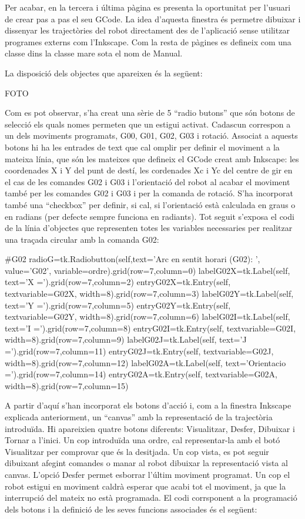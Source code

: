 Per acabar, en la tercera i última pàgina es presenta la oportunitat per l’usuari de crear pas a pas el seu GCode. La idea d’aquesta finestra és permetre dibuixar i dissenyar les trajectòries del robot directament des de l’aplicació sense utilitzar programes externs com l’Inkscape. Com la resta de pàgines es defineix com una classe dins la classe mare sota el nom de Manual. 

La disposició dels objectes que apareixen és la següent:

FOTO

Com es pot observar, s’ha creat una sèrie de 5  “radio butons” que són botons de selecció els quals nomes permeten que un estigui activat. Cadascun correspon a un dels moviments programats, G00, G01, G02, G03 i rotació. Associat a aquests botons hi ha les entrades de text que cal omplir per definir el moviment a la mateixa línia, que són les mateixes que defineix el GCode creat amb Inkscape: les coordenades X i Y del punt de destí, les cordenades Xc i Yc del centre de gir en el cas de les comandes G02 i G03 i l’orientació del robot al acabar el moviment també per les comandes G02 i G03 i per la comanda de rotació. S’ha incorporat també una “checkbox” per definir, si cal, si l’orientació està calculada en graus o en radians (per defecte sempre funciona en radiants). Tot seguit s'exposa el codi de la línia d'objectes que representen totes les variables necessaries per realitzar una traçada circular amb la comanda G02:

\begin{python}
		#G02
		radioG=tk.Radiobutton(self,text='Arc en sentit horari (G02): ', value='G02', variable=ordre).grid(row=7,column=0)
		labelG02X=tk.Label(self, text='X =').grid(row=7,column=2)
		entryG02X=tk.Entry(self, textvariable=G02X, width=8).grid(row=7,column=3)
		labelG02Y=tk.Label(self, text='Y =').grid(row=7,column=5)
		entryG02Y=tk.Entry(self, textvariable=G02Y, width=8).grid(row=7,column=6)
		labelG02I=tk.Label(self, text='I =').grid(row=7,column=8)
		entryG02I=tk.Entry(self, textvariable=G02I, width=8).grid(row=7,column=9)
		labelG02J=tk.Label(self, text='J =').grid(row=7,column=11)
		entryG02J=tk.Entry(self, textvariable=G02J, width=8).grid(row=7,column=12)
		labelG02A=tk.Label(self, text='Orientacio =').grid(row=7,column=14)
		entryG02A=tk.Entry(self, textvariable=G02A, width=8).grid(row=7,column=15)
\end{python}

A partir d’aquí s’han incorporat els botons d’acció i, com a la finestra Inkscape explicada anteriorment, un “canvas” amb la representació de la trajectòria introduïda. Hi apareixien quatre botons diferents: Visualitzar, Desfer, Dibuixar i Tornar a l’inici. Un cop introduïda una ordre, cal representar-la amb el botó Visualitzar per comprovar que és la desitjada. Un cop vista, es pot seguir dibuixant afegint comandes o manar al robot dibuixar la representació vista al canvas. L’opció Desfer permet esborrar l’últim moviment programat. Un cop el robot estigui en moviment caldrà esperar que acabi tot el moviment, ja que la interrupció del mateix no està programada. El codi corrsponent a la programació dels botons i la definició de les seves funcions associades és el següent:

